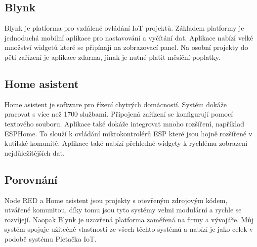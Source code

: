 \subsection{Blynk}
Blynk je platforma pro vzdálené ovládání IoT projektů.
Základem platformy je jednoduchá mobilní aplikace pro nastavování a vyčítání dat.
Aplikace nabízí velké množství widgetů které se připínají na zobrazovací panel.
Na osobní projekty do pěti zařízení je aplikace zdarma, jinak je nutné platit měsíční poplatky.


\subsection{Home asistent}
Home asistent je software pro řízení chytrých domácností. 
Systém dokáže pracovat s více než 1700 službami.
Připojená zařízení se konfigurují pomocí textového souboru.
Aplikace také dokáže integrovat mnoho rozšíření, například ESPHome.
To slouží k ovládání mikrokontrolérů ESP které jsou hojně rozšířené v kutilské komunitě.
Aplikace také nabízí přehledné widgety k rychlému zobrazení nejdůležitějších dat. 


\subsection{Porovnání}
Node RED a Home asistent jsou projekty s otevřeným zdrojovým kódem, utvářené komunitou, díky tomu jsou tyto systémy velmi modulární a rychle se rozvíjejí. %
Naopak Blynk je uzavřená platforma zaměřená na firmy a vývojáře.
Můj systém spojuje užitečné vlastnosti ze všech těchto systémů a nabízí je jako celek v podobě systému Pletačka IoT.
